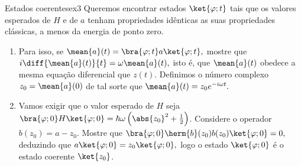 \begin{exercício}{Estados coerentes}{ex3}
   Queremos encontrar estados \(\ket{\varphi; t}\) tais que os valores esperados de \(H\) e de \(a\) tenham propriedades idênticas as suas propriedades clássicas, a menos da energia de ponto zero. 
   \begin{enumerate}[label=(\alph*)]
      \item Para isso, se \(\mean{a}(t) = \bra{\varphi; t}a\ket{\varphi; t},\) mostre que \(i \diff{\mean{a}(t)}{t} = \omega \mean{a}(t),\) isto é, que \(\mean{a}(t)\) obedece a mesma equação diferencial que \(z(t).\) Definimos o número complexo \(z_0 = \mean{a}(0)\) de tal sorte que \(\mean{a}(t) = z_0 e^{-i \omega t}.\)

      \item Vamos exigir que o valor esperado de \(H\) seja \(\bra{\varphi; 0} H \ket{\varphi; 0} = \hbar \omega \left(\abs{z_0}^2 + \frac12\right)\). Considere o operador \(b(z_0) = a - z_0.\) Mostre que \(\bra{\varphi; 0} \herm{b}(z_0) b(z_0) \ket{\varphi; 0} = 0,\) deduzindo que \(a \ket{\varphi; 0} = z_0 \ket{\varphi; 0},\) logo o estado \(\ket{\varphi; 0}\) é o estado coerente \(\ket{z_0}\).
   \end{enumerate}
\end{exercício}
